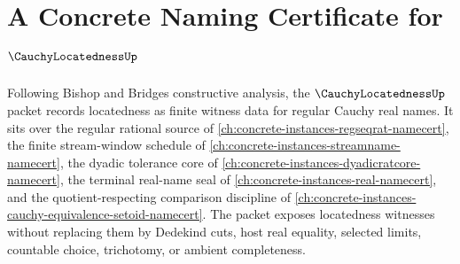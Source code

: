 \chapter{A Concrete Naming Certificate for $\CauchyLocatednessUp$}
\label{ch:concrete-instances-cauchy-locatedness-namecert}

Following Bishop and Bridges constructive analysis, the $\CauchyLocatednessUp$ packet records locatedness as finite witness data for regular Cauchy real names. It sits over the regular rational source of \autoref{ch:concrete-instances-regseqrat-namecert}, the finite stream-window schedule of \autoref{ch:concrete-instances-streamname-namecert}, the dyadic tolerance core of \autoref{ch:concrete-instances-dyadicratcore-namecert}, the terminal real-name seal of \autoref{ch:concrete-instances-real-namecert}, and the quotient-respecting comparison discipline of \autoref{ch:concrete-instances-cauchy-equivalence-setoid-namecert}. The packet exposes locatedness witnesses without replacing them by Dedekind cuts, host real equality, selected limits, countable choice, trichotomy, or ambient completeness.

